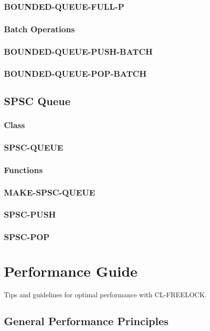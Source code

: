 \documentclass[12pt, letterpaper]{article}
\begin{document}
	\subsubsection{BOUNDED-QUEUE-FULL-P}
	\subsubsection*{Batch Operations}
	\subsubsection{BOUNDED-QUEUE-PUSH-BATCH}
	\subsubsection{BOUNDED-QUEUE-POP-BATCH}
	
	\subsection{SPSC Queue}
	\subsubsection*{Class}
	\subsubsection{SPSC-QUEUE}
	\subsubsection*{Functions}
	\subsubsection{MAKE-SPSC-QUEUE}
	\subsubsection{SPSC-PUSH}
	\subsubsection{SPSC-POP}
	
	\section{Performance Guide}
	Tips and guidelines for optimal performance with CL-FREELOCK.
	\subsection{General Performance Principles}
\end{document}

